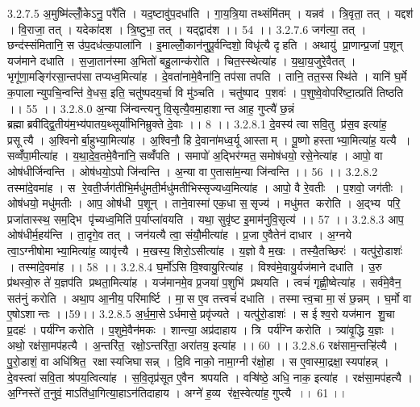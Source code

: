 3.2.7.5
अ॒मुष्मि॑ल्लोँ॒केऽनु॒ परै॑ति । यद॒ष्टावु॑प॒दधा॑ति । गा॒य॒त्रि॒या तथ्संमि॑तम् । यन्नव॑ । त्रि॒वृता॒ तत् । यद्दश॑ । वि॒राजा॒ तत् । यदेका॑दश । त्रि॒ष्टुभा॒ तत् । यद्द्वाद॑श ।। 54 ।।
3.2.7.6
जग॑त्या॒ तत् । छन्द॑स्संमितानि॒ स उ॑प॒दध॑त्क॒पाला॑नि । इ॒माल्लोँ॒कान॑नुपू॒र्वन्दिशो॒ विधृ॑त्यै दृहति । अथायु॑ प्रा॒णान्प्र॒जां प॒शून् यज॑माने दधाति । स॒जा॒तान॑स्मा अ॒भितो॑ बहु॒लान्क॑रोति । चित॒स्स्थेत्या॑ह । य॒था॒य॒जुरे॒वैतत् । भृगू॑णा॒मङ्गि॑रसा॒न्तप॑सा तप्यध्व॒मित्या॑ह । दे॒वता॑नामे॒वैना॑नि॒ तप॑सा तपति । तानि॒ तत॒स्सस्थि॑ते । यानि॑ घ॒र्मे क॒पालान्युपचि॒न्वन्ति॑ वे॒धस॒ इति॒ चतु॑ष्पदय॒र्चा वि मु॑ञ्चति । चतु॑ष्पाद प॒शवः॑ । प॒शुष्वे॒वोपरि॑ष्टा॒त्प्रति॑ तिष्ठति ।। 55 ।।
3.2.8.0
अ॒न्या जि॑न्वन्त्यनु वि॒सृत्यै॒वमा॒हाशान्त आह॒ गुप्त्यै॑ छ॒न्नं ब्रह्माब्रवीद्द्वि॒तीय॑म॒भ्य॑पातय॒थ्सूर्या॑भिनिम्रुक्ते दे॒वाः ।। 8 ।।
3.2.8.1
दे॒वस्य॑ त्वा सवि॒तु प्र॑स॒व इत्या॑ह॒ प्रसूत्यै । अ॒श्विनोर्बा॒हुभ्या॒मित्या॑ह । अ॒श्विनौ॒ हि दे॒वाना॑मध्व॒र्यू आस्ताम् । पू॒ष्णो हस्ताभ्या॒मित्या॑ह॒ यत्यै । सव्वँ॑पा॒मीत्या॑ह । य॒था॒दे॒व॒तमे॒वैना॑नि॒ सव्वँ॑पति । समापो॑ अ॒द्भिर॑ग्मत॒ समोष॑धयो॒ रसे॒नेत्या॑ह । आपो॒ वा ओष॑धीर्जिन्वन्ति । ओष॑धयो॒ऽपो जि॑न्वन्ति । अ॒न्या वा ए॒तासा॑म॒न्या जि॑न्वन्ति ।। 56 ।।
3.2.8.2
तस्मा॑दे॒वमा॑ह । स रे॒वती॒र्जग॑तीभि॒र्मधु॑मती॒र्मधु॑मतीभिस्सृज्यध्व॒मित्या॑ह । आपो॒ वै रे॒वतीः । प॒शवो॒ जग॑तीः । ओष॑धयो॒ मधु॑मतीः । आप॒ ओष॑धी प॒शून् । ताने॒वास्मा॑ एक॒धा स॒॒सृज्य॑ । मधु॑मत करोति । अ॒द्भ्य परि॒ प्रजा॑तास्स्थ॒ सम॒द्भि पृ॑च्यध्व॒मिति॑ प॒र्याप्ला॑वयति । यथा॒ सुवृ॑ष्ट इ॒माम॑नुवि॒सृत्य॑ ।। 57 ।।
3.2.8.3
आप॒ ओष॑धीर्म॒हय॑न्ति । ता॒दृगे॒व तत् । जन॑यत्यै त्वा॒ संयौ॒मीत्या॑ह । प्र॒जा ए॒वैतेन॑ दाधार । अ॒ग्नये त्वा॒ऽग्नीषोमाभ्या॒मित्या॑ह॒ व्यावृ॑त्त्यै । म॒खस्य॒ शिरो॒ऽसीत्या॑ह । य॒ज्ञो वै म॒खः । तस्यै॒तच्छिरः॑ । यत्पु॑रो॒डाशः॑ । तस्मा॑दे॒वमा॑ह ।। 58 ।।
3.2.8.4
घ॒र्मो॑ऽसि वि॒श्वायु॒रित्या॑ह । विश्व॑मे॒वायु॒र्यज॑माने दधाति । उ॒रु प्र॑थस्वो॒रु ते॑ य॒ज्ञप॑ति प्रथता॒मित्या॑ह । यज॑मानमे॒व प्र॒जया॑ प॒शुभि॑ प्रथयति । त्वचं॑ गृह्णी॒ष्वेत्या॑ह । सर्व॑मे॒वैन॒॒ सत॑नुं करोति । अथा॒प आ॒नीय॒ परि॑मार्ष्टि । मा॒॒स ए॒व तत्त्वचं॑ दधाति । तस्मात्त्व॒चा मा॒॒सं छ॒न्नम् । घ॒र्मो वा ए॒षोऽशान्तः ।।59।।
3.2.8.5
अ॒र्ध॒मा॒सेऽर्धमासे॒ प्रवृ॑ज्यते । यत्पु॑रो॒डाशः॑ । स ईश्व॒रो यज॑मान शु॒चा प्र॒दहः॑ । पर्य॑ग्नि करोति । प॒शुमे॒वैन॑मकः । शान्त्या॒ अप्र॑दाहाय । त्रि पर्य॑ग्नि करोति । त्र्या॑वृ॒द्धि य॒ज्ञः । अथो॒ रक्ष॑सा॒मप॑हत्यै । अ॒न्तरि॑त॒॒ रक्षो॒ऽन्तरि॑ता॒ अरा॑तय॒ इत्या॑ह ।। 60 ।।
3.2.8.6
रक्ष॑साम॒न्तऱ्हि॑त्यै । पु॒रो॒डाशं॒ वा अधि॑श्रित॒॒ रक्षा॑स्यजिघासन्न् । दि॒वि नाको॒ नामा॒ग्नी र॑क्षो॒हा । स ए॒वास्मा॒द्रक्षा॒॒स्यपा॑हन्न् । दे॒वस्त्वा॑ सवि॒ता श्र॑पय॒त्वित्या॑ह । स॒वि॒तृप्र॑सूत ए॒वैन॑ श्रपयति । वऱ्षि॑ष्ठे॒ अधि॒ नाक॒ इत्या॑ह । रक्ष॑सा॒मप॑हत्यै । अ॒ग्निस्ते॑ त॒नुवं॒ माऽति॑धा॒गित्या॒हाऽन॑तिदाहाय । अग्ने॑ ह॒व्य र॑क्ष॒स्वेत्या॑ह॒ गुप्त्यै ।। 61 ।।

